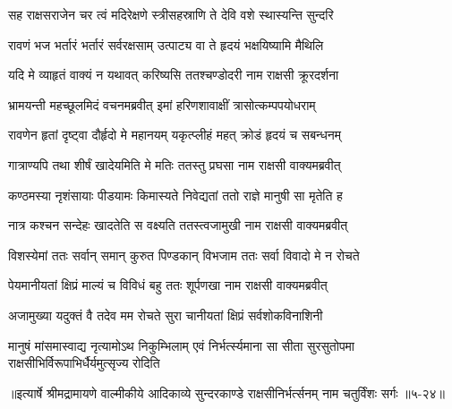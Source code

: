 \twolineshloka
{सह राक्षसराजेन चर त्वं मदिरेक्षणे}
{स्त्रीसहस्राणि ते देवि वशे स्थास्यन्ति सुन्दरि} %

\twolineshloka
{रावणं भज भर्तारं भर्तारं सर्वरक्षसाम्}
{उत्पाट्य वा ते हृदयं भक्षयिष्यामि मैथिलि} %

\twolineshloka
{यदि मे व्याहृतं वाक्यं न यथावत् करिष्यसि}
{ततश्चण्डोदरी नाम राक्षसी क्रूरदर्शना} %

\twolineshloka
{भ्रामयन्ती महच्छूलमिदं वचनमब्रवीत्}
{इमां हरिणशावाक्षीं त्रासोत्कम्पपयोधराम्} %

\twolineshloka
{रावणेन हृतां दृष्ट्वा दौर्हृदो मे महानयम्}
{यकृत्प्लीहं महत् क्रोडं हृदयं च सबन्धनम्} %

\twolineshloka
{गात्राण्यपि तथा शीर्षं खादेयमिति मे मतिः}
{ततस्तु प्रघसा नाम राक्षसी वाक्यमब्रवीत्} %

\twolineshloka
{कण्ठमस्या नृशंसायाः पीडयामः किमास्यते}
{निवेद्यतां ततो राज्ञे मानुषी सा मृतेति ह} %

\twolineshloka
{नात्र कश्चन सन्देहः खादतेति स वक्ष्यति}
{ततस्त्वजामुखी नाम राक्षसी वाक्यमब्रवीत्} %

\twolineshloka
{विशस्येमां ततः सर्वान् समान् कुरुत पिण्डकान्}
{विभजाम ततः सर्वा विवादो मे न रोचते} %

\twolineshloka
{पेयमानीयतां क्षिप्रं माल्यं च विविधं बहु}
{ततः शूर्पणखा नाम राक्षसी वाक्यमब्रवीत्} %

\twolineshloka
{अजामुख्या यदुक्तं वै तदेव मम रोचते}
{सुरा चानीयतां क्षिप्रं सर्वशोकविनाशिनी} %

\threelineshloka
{मानुषं मांसमास्वाद्य नृत्यामोऽथ निकुम्भिलाम्}
{एवं निर्भर्त्स्यमाना सा सीता सुरसुतोपमा}
{राक्षसीभिर्विरूपाभिर्धैर्यमुत्सृज्य रोदिति} %


॥इत्यार्षे श्रीमद्रामायणे वाल्मीकीये आदिकाव्ये सुन्दरकाण्डे राक्षसीनिर्भर्त्सनम् नाम चतुर्विंशः सर्गः ॥५-२४॥
